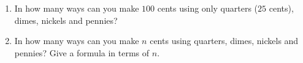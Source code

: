 \begin{enumerate}
\item[(a)] In how many ways can you make $100$ cents using only quarters ($25$ cents), dimes, nickels and pennies?
\item[(b)] In how many ways can you make $n$ cents using quarters, dimes, nickels and pennies? Give a formula in terms of $n$.
\end{enumerate}
